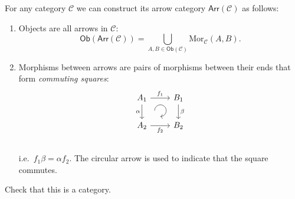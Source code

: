 \documentclass[english,letterpaper]{article}%
\numberwithin{equation}{section}
\numberwithin{figure}{section}
\numberwithin{table}{section}
\theoremstyle{definition}
\theoremstyle{definition}
\theoremstyle{definition}
\theoremstyle{plain}
\theoremstyle{plain}
\theoremstyle{plain}
\theoremstyle{plain}
\theoremstyle{remark}
\theoremstyle{remark}
\begin{document}
%
\begin{defn}
For any category $\mathcal{C}$ we can construct its arrow category
$\mathsf{Arr}\left(\mathcal{C}\right)$ as follows:
\begin{enumerate}
\item Objects are all arrows in $\mathcal{C}$: 
\[
\mathsf{Ob}\left(\mathsf{Arr}\left(\mathcal{C}\right)\right)=\bigcup_{A,B\in\mathsf{Ob}\left(\mathcal{C}\right)}\mathrm{Mor}_{\mathcal{C}}\left(A,B\right).
\]
\item Morphisms between arrows are pairs of morphisms between their ends
that form \emph{commuting squares}:\[\begin{tikzcd}[every matrix/.append style={name=m},   
execute at end picture={\draw [<-] ([xshift=-2.2em,yshift=.3em]m-2-2.north) arc[start angle=-90,delta angle=270,radius=0.25cm];}]
   A_1\arrow[r,"f_1" ]\arrow[d,swap,"\alpha" ]& B_1 \arrow[d,"\beta" ] \\
   A_2\arrow[r,swap,"f_2" ]& B_2\\
\end{tikzcd}\]i.e.\ $f_{1}\beta=\alpha f_{2}$. The circular arrow is used to indicate
that the square commutes.
\end{enumerate}
\end{defn}
\begin{xca}
Check that this is a category.
\end{xca}
\end{document}
